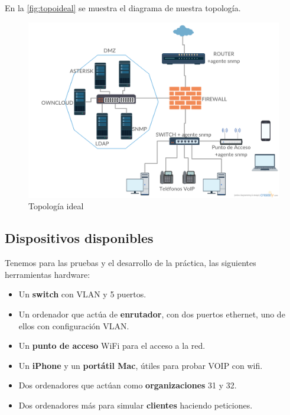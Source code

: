\documentclass[]{article}
\begin{document}
En la \autoref{fig:topoideal} se muestra el diagrama de nuestra topología.

\begin{figure}[h]
	\centering
	\includegraphics[scale=0.35]{images/topoideal.png}
	\caption{Topología ideal}
	\label{fig:topoideal}
\end{figure}

\subsection{Dispositivos disponibles}

Tenemos para las pruebas y el desarrollo de la práctica, las siguientes herramientas hardware:

\begin{itemize}

	\item Un \textbf{switch} con VLAN y 5 puertos.
	\item Un ordenador que actúa de \textbf{enrutador}, con dos puertos ethernet, uno de ellos con configuración VLAN.
	\item Un \textbf{punto de acceso} WiFi para el acceso a la red.
	\item Un \textbf{iPhone} y un \textbf{portátil Mac}, útiles para probar VOIP con wifi.
	\item Dos ordenadores que actúan como \textbf{organizaciones} 31 y 32.
	\item Dos ordenadores más para simular \textbf{clientes} haciendo peticiones.

\end{itemize}
\end{document}

